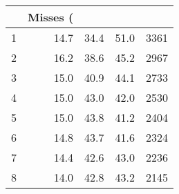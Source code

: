 \begin{tabular}{|r|r|r|r|r|}
\hline
\minneigh{}&Misses (%
\\
\hline
\hline
1&14.7&34.4&51.0&3361
\\
\hline
2&16.2&38.6&45.2&2967
\\
\hline
3&15.0&40.9&44.1&2733
\\
\hline
4&15.0&43.0&42.0&2530
\\
\hline
5&15.0&43.8&41.2&2404
\\
\hline
6&14.8&43.7&41.6&2324
\\
\hline
7&14.4&42.6&43.0&2236
\\
\hline
8&14.0&42.8&43.2&2145
\\
\hline
\hline
\end{tabular}
